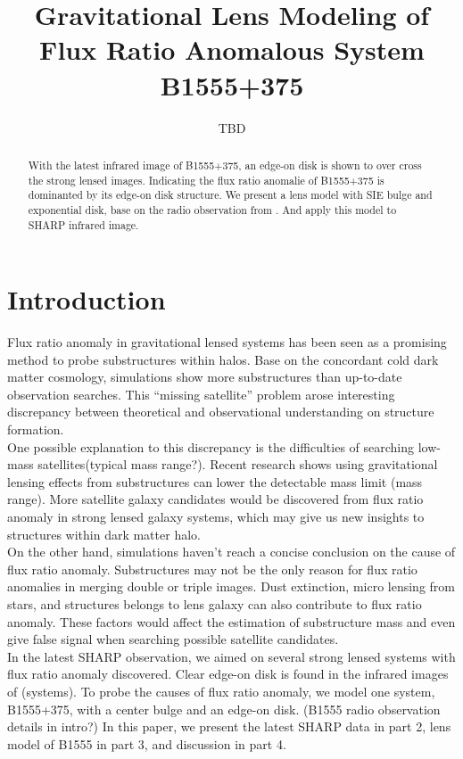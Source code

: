 \documentclass[manuscript]{emulateapj}
\begin{document}
\title{Gravitational Lens Modeling of Flux Ratio Anomalous System B1555+375}
\author{TBD}

\begin{abstract}
With the latest infrared image of B1555+375, an edge-on disk is shown to over cross the strong lensed images. Indicating the flux ratio anomalie of B1555+375 is dominanted by its edge-on disk structure. We present a lens model with SIE bulge and exponential disk, base on the radio observation from \citet{Marlow}. And apply this model to SHARP infrared image.

\end{abstract}


\section{Introduction}
Flux ratio anomaly in gravitational lensed systems has been seen as a promising method to probe substructures within halos.
Base on the concordant cold dark matter cosmology, simulations show more substructures than up-to-date observation searches.
This ``missing satellite'' problem arose interesting discrepancy between theoretical and observational understanding on structure
formation. \\
One possible explanation to this discrepancy is the difficulties of searching low-mass satellites(typical mass range?). Recent research shows using gravitational lensing effects from substructures can lower the detectable mass limit (mass range). More satellite galaxy candidates would be discovered from flux ratio anomaly in strong lensed galaxy systems, which may give us new insights to structures within dark matter halo. \\
On the other hand, simulations haven't reach a concise conclusion on the cause of flux ratio anomaly. Substructures may not be the only reason for flux ratio anomalies in merging double or triple images. Dust extinction, micro lensing from stars, and structures belongs to lens galaxy can also contribute to flux ratio anomaly. These factors would affect the estimation of substructure mass and even give false signal when searching possible satellite candidates.\\
In the latest SHARP observation, we aimed on several strong lensed systems with flux ratio anomaly discovered. Clear edge-on disk is found in the infrared images of (systems). To probe the causes of flux ratio anomaly, we model one system, B1555+375, with a center bulge and an edge-on disk. (B1555 radio observation details in intro?) In this paper, we present the latest SHARP data in part 2, lens model of B1555 in part 3, and discussion in part 4. 
\end{document}

